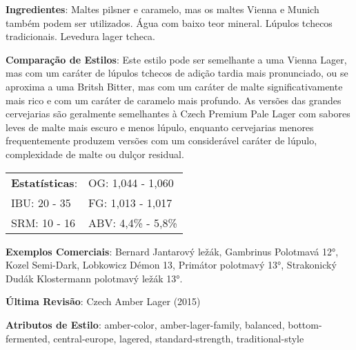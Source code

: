 \textbf{Ingredientes}: Maltes pilsner e caramelo, mas os maltes Vienna e Munich também podem ser utilizados. Água com baixo teor mineral. Lúpulos tchecos tradicionais. Levedura lager tcheca.

\textbf{Comparação de Estilos}: Este estilo pode ser semelhante a uma Vienna Lager, mas com um caráter de lúpulos tchecos de adição tardia mais pronunciado, ou se aproxima a uma Britsh Bitter, mas com um caráter de malte significativamente mais rico e com um caráter de caramelo mais profundo. As versões das grandes cervejarias são geralmente semelhantes à Czech Premium Pale Lager com sabores leves de malte mais escuro e menos lúpulo, enquanto cervejarias menores frequentemente produzem versões com um considerável caráter de lúpulo, complexidade de malte ou dulçor residual.

\begin{tabular}{@{}p{35mm}p{35mm}@{}}
  \textbf{Estatísticas}: & OG: 1,044 - 1,060 \\
  IBU: 20 - 35  & FG: 1,013 - 1,017  \\
  SRM: 10 - 16   & ABV: 4,4\% - 5,8\%
\end{tabular}

\textbf{Exemplos Comerciais}: Bernard Jantarový ležák, Gambrinus Polotmavá 12°, Kozel Semi-Dark, Lobkowicz Démon 13, Primátor polotmavý 13°, Strakonický Dudák Klostermann polotmavý ležák 13°.

\textbf{Última Revisão}: Czech Amber Lager (2015)

\textbf{Atributos de Estilo}: amber-color, amber-lager-family, balanced, bottom-fermented, central-europe, lagered, standard-strength, traditional-style